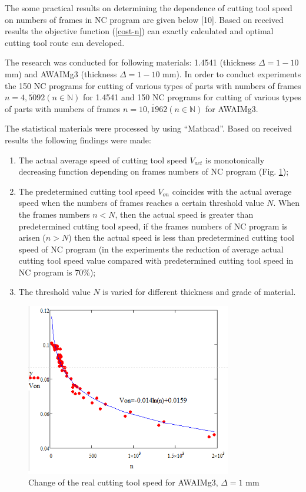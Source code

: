 \documentclass[runningheads]{llncs}
\begin{document}
The some practical results on determining
the dependence of cutting tool speed on numbers of frames in NC program
are given below [10].
Based on received results the objective function (\ref{cost-n})
can exactly calculated and optimal cutting tool route can developed.

The research was conducted for following materials:
1.4541 (thickness $\Delta=1-10$ mm) and
AWAIMg3 (thickness $\Delta=1-10$ mm).
In order to conduct experiments the 150 NC programs
for cutting of various types of parts with numbers of frames
$n=\overline{4, 5092}(n \in \mathbb{N})$
for 1.4541
and 150 NC programs for cutting of various types of parts with numbers of frames
$n = \overline{10, 1962} (n \in \mathbb N)$
for AWAIMg3.

The statistical materials were processed by using ``Mathcad''.
Based on received results the following findings were made:

\begin{enumerate}
\item
The actual average speed of cutting tool speed $V_{act}$
is monotonically decreasing function depending on frames numbers of NC program
(Fig. \ref{plot});

\item
The predetermined cutting tool speed $V_{on}$
coincides with the actual average speed
when the numbers of frames reaches a certain threshold value $N$.
When the frames numbers $n < N$,
then the actual speed is greater than predetermined cutting tool speed,
if the frames numbers of NC program is arisen ($n>N$)
then the actual speed is less than
predetermined cutting tool speed of NC program
(in the experiments the reduction of average actual cutting tool speed value
compared with predetermined cutting tool speed in NC program is 70\%);

\item
The threshold value $N$ is varied for different thickness and grade of material.
\end{enumerate}

\begin{figure}
  \begin{center}
  \includegraphics[width=0.8\textwidth]{plot.png}
  \caption{Change of the real cutting tool speed for AWAIMg3, $\Delta=1$ mm}
  \label{plot}
  \end{center}
\end{figure}
\end{document}
